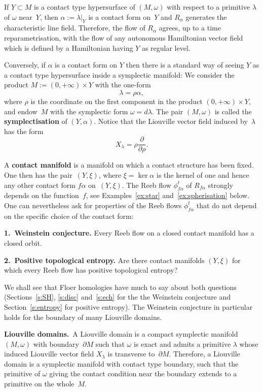\documentclass[12pt,twoside]{amsart}
\theoremstyle{plain}
\numberwithin{figure}{section}
\numberwithin{equation}{section}
\def\s{\smallskip}
\def\m{\medskip}
\def\ga{\alpha}
\def\pp{\partial}
\def\ni{\noindent}
\def\m{\medskip}
\begin{document}
If $Y \subset M$ is a contact type hypersurface of $(M,\omega)$ with respect to a primitive $\lambda$ 
of $\omega$ near~$Y$, then $\alpha := \lambda|_Y$ is a contact form on~$Y$ and $R_{\alpha}$ 
generates the characteristic line field. Therefore, the flow of $R_{\alpha}$ agrees, up to a time reparametrisation,  with the flow of any autonomous Hamiltonian vector field which is defined by a Hamiltonian having $Y$ as regular level.

Conversely, if $\alpha$ is a contact form on $Y$ then there is a standard way of seeing $Y$ as a contact type hypersurface inside a symplectic manifold: We consider the product $M := (0,+\infty) \times Y$ with the one-form
\[
\lambda = \rho \alpha,
\]
where $\rho$ is the coordinate on the first component in the product $(0,+\infty) \times Y$, 
and endow~$M$ with the symplectic form $\omega = d \lambda$. 
The pair $(M,\omega)$ is called the {\bf symplectisation} of $(Y,\alpha)$. 
Notice that the Liouville vector field induced by~$\lambda$ has the form
\[
X_{\lambda} = \rho \frac{\partial}{\partial \rho}.
\]

A {\bf contact manifold} is a manifold on which a contact structure has been fixed. 
One then has the pair~$(Y,\xi)$, where $\xi = \ker \alpha$ is the kernel of one
and hence any other contact form $f \ga$ on~$(Y,\xi)$.
The Reeb flow $\phi_{f\ga}^t$ of $R_{f \ga}$ strongly depends on the function~$f$,
see Examples~\ref{ex:star} and~\ref{ex:spherisation} below.
One can nevertheless ask for properties of the Reeb flows $\phi_{f\ga}^t$ 
that do not depend on the specific choice of the contact form:

\m \ni
{\bf 1.\ Weinstein conjecture.}
Every Reeb flow on a closed contact manifold has a closed orbit.

\s \ni
{\bf 2.\ Positive topological entropy.} 
Are there contact manifolds $(Y,\xi)$ for which every Reeb flow 
has positive topological entropy?

\m
We shall see that Floer homologies have much to say about both questions
(Sections~\ref{s:SH}, \ref{s:disc} and~\ref{s:ech} for the the Weinstein conjecture and 
Section~\ref{s:entropy} for positive entropy).
The Weinstein conjecture in particular holds for the boundary of many Liouville domains.

\m \ni
{\bf Liouville domains.}\  
A Liouville domain is a compact symplectic manifold~$(M,\omega)$ with boundary~$\pp M$ 
such that $\omega$ is exact and admits a primitive $\lambda$ whose induced Liouville vector field $X_{\lambda}$ 
is transverse to~$\partial M$. 
Therefore, a Liouville domain is a symplectic manifold with contact type boundary, 
such that the primitive of $\omega$ giving the contact condition near the boundary 
extends to a primitive on the whole~$M$.
\end{document}
